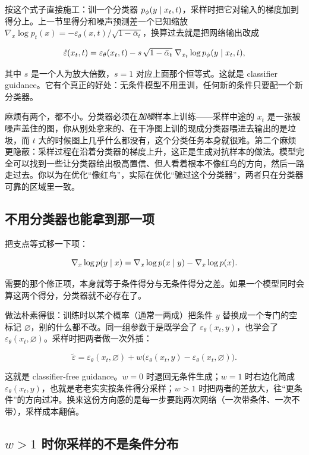 按这个式子直接施工：训一个分类器 \(p_\phi(y\mid x_t,t)\)，采样时把它对输入的梯度加到得分上。上一节里得分和噪声预测差一个已知缩放 \(\nabla_x\log p_t(x)=-\varepsilon_\theta(x,t)/\sqrt{1-\bar\alpha_t}\)，换算过去就是把网络输出改成

\[
\hat\varepsilon(x_t,t)=\varepsilon_\theta(x_t,t)-s\,\sqrt{1-\bar\alpha_t}\;\nabla_{x_t}\log p_\phi(y\mid x_t,t),
\]

其中 \(s\) 是一个人为放大倍数，\(s=1\) 对应上面那个恒等式。这就是 classifier guidance。它有个真正的好处：无条件模型不用重训，任何新的条件只要配一个新分类器。

麻烦有两个，都不小。分类器必须在\emph{加噪}样本上训练——采样中途的 \(x_t\) 是一张被噪声盖住的图，你从别处拿来的、在干净图上训的现成分类器喂进去输出的是垃圾，而 \(t\) 大的时候图上几乎什么都没有，这个分类任务本身就很难。第二个麻烦更隐蔽：采样过程在沿着分类器的梯度上升，这正是生成对抗样本的做法。模型完全可以找到一些让分类器给出极高置信、但人看着根本不像红鸟的方向，然后一路走过去。你以为在优化``像红鸟''，实际在优化``骗过这个分类器''，两者只在分类器可靠的区域里一致。

\subsection{不用分类器也能拿到那一项}

把支点等式移一下项：

\[
\nabla_x\log p(y\mid x)=\nabla_x\log p(x\mid y)-\nabla_x\log p(x).
\]

需要的那个修正项，本身就等于条件得分与无条件得分之差。如果一个模型同时会算这两个得分，分类器就不必存在了。

做法朴素得很：训练时以某个概率（通常一两成）把条件 \(y\) 替换成一个专门的空标记 \(\varnothing\)，别的什么都不改。同一组参数于是既学会了 \(\varepsilon_\theta(x_t,y)\)，也学会了 \(\varepsilon_\theta(x_t,\varnothing)\)。采样时把两者做一次外插：

\[
\tilde\varepsilon=\varepsilon_\theta(x_t,\varnothing)+w\bigl(\varepsilon_\theta(x_t,y)-\varepsilon_\theta(x_t,\varnothing)\bigr).
\]

这就是 classifier-free guidance。\(w=0\) 时退回无条件生成；\(w=1\) 时右边化简成 \(\varepsilon_\theta(x_t,y)\)，也就是老老实实按条件得分采样；\(w>1\) 时把两者的差放大，往``更条件''的方向过冲。换来这份方向感的是每一步要跑两次网络（一次带条件、一次不带），采样成本翻倍。

\subsection{\texorpdfstring{\(w>1\) 时你采样的不是条件分布}{w>1 时你采样的不是条件分布}}

